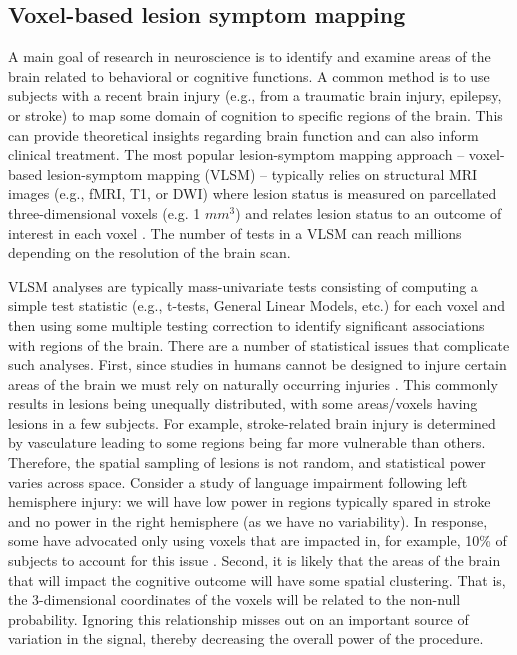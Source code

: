 \documentclass[bimj,fleqn]{w-art}
\theoremstyle{plain}
\theoremstyle{definition}
\begin{document}
\subsection{Voxel-based lesion symptom mapping}\label{sec.VLSM}


A main goal of research in neuroscience is to identify and examine areas of the brain related to behavioral or cognitive functions.  A common method is to use subjects with a recent brain injury (e.g., from a traumatic brain injury, epilepsy, or stroke) to map some domain of cognition to specific regions of the brain. This can provide theoretical insights regarding brain function and can also inform clinical treatment. The most popular lesion-symptom mapping approach -- voxel-based lesion-symptom mapping (VLSM) \citep{Batetal03,Roretal07}-- typically relies on structural MRI images (e.g., fMRI, T1, or DWI) where lesion status is measured on  parcellated three-dimensional voxels (e.g. 1 $mm^3$) and relates lesion status to an outcome of interest in each voxel \citep[see][for a recent review of the field]{Karetal17}.  The number of tests in a VLSM can reach millions depending on the resolution of the brain scan.

VLSM analyses are typically mass-univariate tests consisting of computing a simple test statistic (e.g., t-tests, General Linear Models, etc.) for each voxel and then using some multiple testing correction to identify significant associations with regions of the brain. There are a number of statistical issues that complicate such analyses.  First, since studies in humans cannot be designed to injure certain areas of the brain we must rely on naturally occurring injuries \citep{RorKar04}.  This commonly results in lesions being unequally distributed, with some areas/voxels having lesions in a few subjects. For example, stroke-related brain injury is determined by vasculature leading to some regions being far more vulnerable than others. Therefore, the spatial sampling of lesions is not random, and statistical power varies across space. Consider a study of language impairment following left hemisphere injury: we will have low power in regions typically spared in stroke and no power in the right hemisphere (as we have no variability). In response, some have advocated only using voxels that are impacted in, for example, 10\% of subjects to account for this issue \citep{Holetal96}.  Second, it is likely that the areas of the brain that will impact the cognitive outcome will have some spatial clustering. That is, the 3-dimensional coordinates of the voxels will be related to the non-null probability. Ignoring this relationship misses out on an important source of variation in the signal, thereby decreasing the overall power of the procedure. 
\end{document}
